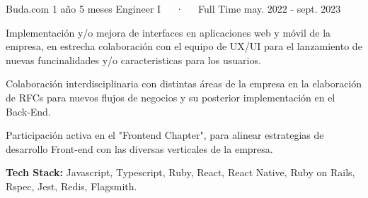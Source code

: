 

\begin{cventries}

  \cventry
    {Buda.com} %
    {1 año 5 meses} %
    {Engineer I~~~·~~~Full Time } %
    {may. 2022 - sept. 2023} %
    {
      \begin{cvitems}
        \item {Implementación y/o mejora de interfaces en aplicaciones web y móvil de la empresa, en estrecha 
        colaboración con el equipo de UX/UI para el lanzamiento de nuevas funcinalidades y/o caracteristicas para los usuarios.}
        \item {Colaboración interdisciplinaria con distintas áreas de la empresa en la elaboración de RFCs para nuevos flujos de negocios y su posterior implementación en el Back-End.}
        \item {Participación activa en el "Frontend Chapter", para alinear estrategias de desarrollo Front-end con las diversas verticales de la empresa.}
        \item {\textbf{Tech Stack:} Javascript, Typescript, Ruby, React, React Native, Ruby on Rails, Rspec, Jest, Redis, Flagsmith.}
      \end{cvitems}
    }
  

\end{cventries}
